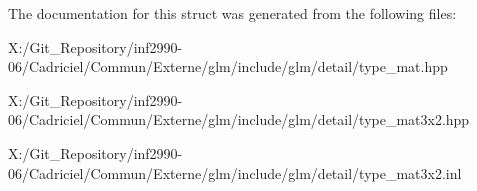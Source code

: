 The documentation for this struct was generated from the following files\-:\begin{DoxyCompactItemize}
\item 
X\-:/\-Git\-\_\-\-Repository/inf2990-\/06/\-Cadriciel/\-Commun/\-Externe/glm/include/glm/detail/type\-\_\-mat.\-hpp\item 
X\-:/\-Git\-\_\-\-Repository/inf2990-\/06/\-Cadriciel/\-Commun/\-Externe/glm/include/glm/detail/type\-\_\-mat3x2.\-hpp\item 
X\-:/\-Git\-\_\-\-Repository/inf2990-\/06/\-Cadriciel/\-Commun/\-Externe/glm/include/glm/detail/type\-\_\-mat3x2.\-inl\end{DoxyCompactItemize}
